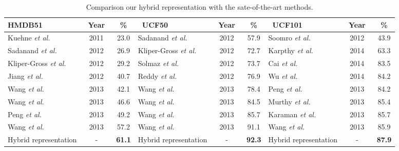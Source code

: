 \documentclass[twocolumn]{svjour3}          \smartqed  \usepackage{slashbox}
\begin{document}
\begin{table*}
  \caption{Comparison our hybrid representation with the sate-of-the-art methods.}
  \label{tbl:cmp}
  \centering
  \begin{tabular}{lcc|lcc|lcc}
  \hline
  \hline
  HMDB51 & ~Year~ & \% & ~UCF50 & ~Year~ & \% & ~UCF101 & ~Year~ &\% \\
  \hline
  \hline
  Kuehne \emph{et al.} \cite {KuehneJGPS11} & 2011 & 23.0 &  Sadanand \emph{et al.} \cite{SadanandC12} & 2012 & 57.9 & Soomro \emph{et al.} \cite{SOOMRO12} & ~2012~ & 43.9 \\
  Sadanand \emph{et al.} \cite{SadanandC12} & 2012 & 26.9 & Kliper-Gross \emph{et al.} \cite{Kliper-GrossGHW12} & 2012 & 72.7 & Karpthy \emph{et al.} \cite{Karpathy14} & 2014 & 63.3 \\
  Kliper-Gross \emph{et al.} \cite{Kliper-GrossGHW12} & 2012 & 29.2 & Solmaz \emph{et al.} \cite{SolmazAS13} &  2012 & 73.7  &  Cai \emph{et al.} \cite{CaiWPQ14} & 2014 & 83.5  \\
  Jiang \emph{et al.} \cite{JiangDXLN12} & 2012 & 40.7 & Reddy \emph{et al.} \cite{ReddyS13} & 2012 & 76.9  & Wu \emph{et al.} \cite{WuZL14} & 2014 & 84.2 \\
  Wang \emph{et al.} \cite{WangQT13} & 2013 & 42.1  & Wang \emph{et al.} \cite{WangQT13} & 2013 & 78.4 &  Peng \emph{et al.} \cite{PengWCQP13} & 2013 & 84.2  \\
  Wang \emph{et al.} \cite{WangKSL13} & 2013 & 46.6 &  Wang \emph{et al.} \cite{WangKSL13}  & 2013 & 84.5 & Murthy \emph{et al.} \cite{Murthy13} & 2013 & 85.4   \\
  Peng \emph{et al.} \cite{PengQPQ13}& 2013 & 49.2 & Wang \emph{et al.} \cite{WangQT13b}  & 2013 & 85.7  & Karaman \emph{et al.} \cite{Karaman13} & 2013 & 85.7 \\
  Wang \emph{et al.} \cite{WangS13a} & 2013 & 57.2 & Wang \emph{et al.} \cite{WangS13a} & 2013 & 91.1 & Wang \emph{et al.} \cite{Wang13} & 2013 & 85.9 \\
  \hline
  Hybrid representation & - & \textbf{61.1} & Hybrid representation & - & \textbf{92.3} & Hybrid representation & - & \textbf{87.9} \\
  \hline
  \hline
  \end{tabular}
\end{table*}
\end{document}
